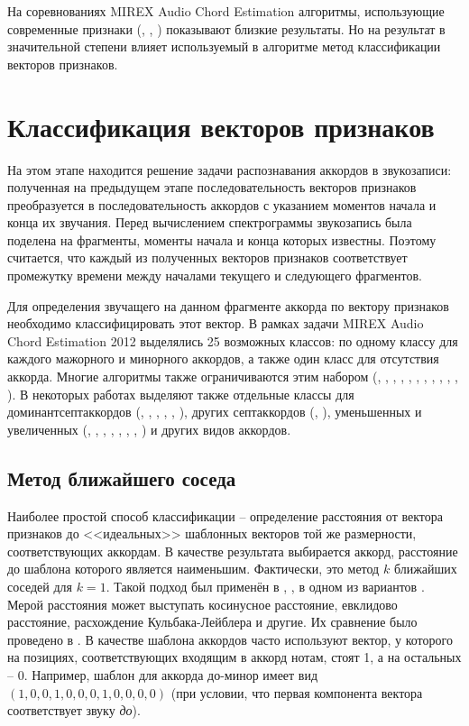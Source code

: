 На соревнованиях MIREX Audio Chord Estimation алгоритмы, использующие
современные признаки (\cite{Khadkevich2011}, \cite{Mauch2010},
\cite{Mueller2009}) показывают близкие результаты. Но на результат в
значительной степени влияет используемый в алгоритме метод классификации
векторов признаков.

\section{Классификация векторов признаков} \label{sectL_post}

На этом этапе находится решение задачи распознавания аккордов в звукозаписи:
полученная на предыдущем этапе последовательность векторов признаков
преобразуется в последовательность аккордов с указанием моментов начала и конца
их звучания. Перед вычислением спектрограммы звукозапись была поделена на
фрагменты, моменты начала и конца которых известны. Поэтому считается, что
каждый из полученных векторов признаков соответствует промежутку времени между
началами текущего и следующего фрагментов.

Для определения звучащего на данном фрагменте аккорда по вектору признаков
необходимо классифицировать этот вектор. В рамках задачи MIREX Audio Chord
Estimation 2012 выделялись 25 возможных классов: по одному классу для каждого
мажорного и минорного аккордов, а также один класс для отсутствия аккорда.
Многие алгоритмы также ограничиваются этим набором (\cite{Bello2005},
\cite{Lee2006}, \cite{Khadkevich2009}, \cite{Oudre2009}, \cite{Weller2009},
\cite{Cho2010}, \cite{Rocher2010}, \cite{Cho2011}, \cite{Jiang2011},
\cite{Ni2011}, \cite{Chen2012}, \cite{Humphrey2012}). В некоторых работах
выделяют также отдельные классы для доминантсептаккордов (\cite{Sheh2003},
\cite{Mauch2008}, \cite{Zhang2008}, \cite{Mauch2009}, \cite{Mauch2010},
\cite{DeHaas2012}), других септаккордов (\cite{Sheh2003}, \cite{Mauch2010}),
уменьшенных и увеличенных (\cite{Sheh2003}, \cite{Burgoyne2007},
\cite{Lee2008}, \cite{Mauch2008}, \cite{Sumi2008}, \cite{Mauch2009},
\cite{Mauch2010}, \cite{Ni2012}) и других видов аккордов.

\subsection{Метод ближайшего соседа}

Наиболее простой способ классификации -- определение расстояния от вектора
признаков до <<идеальных>> шаблонных векторов той же размерности,
соответствующих аккордам. В качестве результата выбирается аккорд, расстояние до
шаблона которого является наименьшим. Фактически, это метод $k$ ближайших
соседей для $k=1$. Такой подход был применён в \cite{Lee2006}, \cite{Oudre2009},
в одном из вариантов \cite{Jiang2011}. Мерой расстояния может выступать
косинусное расстояние, евклидово расстояние, расхождение Кульбака-Лейблера и
другие. Их сравнение было проведено в \cite{Oudre2009}. В качестве шаблона
аккордов часто используют вектор, у которого на позициях, соответствующих
входящим в аккорд нотам, стоят 1, а на остальных -- 0. Например, шаблон для
аккорда до-минор имеет вид $(1,0,0,1,0,0,0,1,0,0,0,0)$ (при условии, что первая
компонента вектора соответствует звуку \emph{до}).

